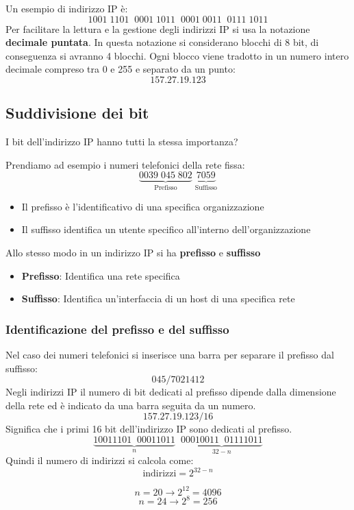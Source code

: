 \documentclass[a4paper]{article}
\begin{document}
\begin{example}
  Un esempio di indirizzo IP è:
  \[
    1001 \; 1101 \;\; 0001 \; 1011 \;\; 0001 \; 0011 \;\; 0111 \; 1011
  \] 
  Per facilitare la lettura e la gestione degli indirizzi IP si usa la notazione
  \textbf{decimale puntata}. In questa notazione si considerano blocchi di 8 bit, di
  conseguenza si avranno 4 blocchi. Ogni blocco viene tradotto in un numero intero decimale
  compreso tra 0 e 255 e separato da un punto:
  \[
    157.27.19.123
  \] 
\end{example}

\subsection{Suddivisione dei bit}
I bit dell'indirizzo IP hanno tutti la stessa importanza?

\vspace{1em}
\noindent
Prendiamo ad esempio i numeri telefonici della rete fissa:
\[
  \underbrace{0039 \; 045 \; 802}_{\text{Prefisso}} \; \underbrace{7059}_{\text{Suffisso}}
\] 
\begin{itemize}
  \item Il prefisso è l'identificativo di una specifica organizzazione
  \item Il suffisso identifica un utente specifico all'interno dell'organizzazione
\end{itemize}

\vspace{1em}
\noindent
Allo stesso modo in un indirizzo IP si ha \textbf{prefisso} e \textbf{suffisso}
\begin{itemize}
  \item \textbf{Prefisso}: Identifica una rete specifica
  \item \textbf{Suffisso}: Identifica un'interfaccia di un host di una specifica rete 
\end{itemize}

\subsubsection{Identificazione del prefisso e del suffisso}
Nel caso dei numeri telefonici si inserisce una barra per separare il prefisso dal suffisso:
\[
  045/7021412
\]
Negli indirizzi IP il numero di bit dedicati al prefisso dipende dalla dimensione della
rete ed è indicato da una barra seguita da un numero.
\[
  157.27.19.123/16
\] 
Significa che i primi 16 bit dell'indirizzo IP sono dedicati al prefisso.
\[
  \underbrace{10011101 \;\; 00011011}_{n} \;\; \underbrace{00010011 \;\; 01111011}_{32 - n}
\] 
Quindi il numero di indirizzi si calcola come:
\[
  \text{indirizzi} = 2^{32-n}
\] 
\begin{example}
  \[
    n = 20 \to 2^{12} = 4096
  \] 
  \[
    n = 24 \to 2^8 = 256
  \] 
\end{example}
\end{document}
